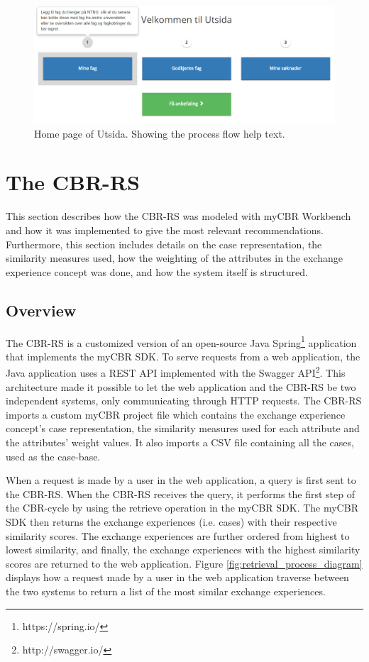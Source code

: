 \begin{figure}[h]
    \centering
    \includegraphics[width=1\textwidth]{fig/utsida_screenshots/steps.png}
    \caption[Home page of Utsida]{Home page of Utsida. Showing the process flow help text.}
    \label{fig:utsida_index}
\end{figure}

\section{The CBR-RS}

This section describes how the CBR-RS was modeled with myCBR Workbench and how it was implemented to give the most relevant recommendations. Furthermore, this section includes details on the case representation, the similarity measures used, how the weighting of the attributes in the exchange experience concept was done, and how the system itself is structured.

\subsection{Overview}

The CBR-RS is a customized version of an open-source Java Spring\footnote{https://spring.io/} application that implements the myCBR SDK. To serve requests from a web application, the Java application uses a REST API implemented with the Swagger API\footnote{http://swagger.io/}. This architecture made it possible to let the web application and the CBR-RS be two independent systems, only communicating through HTTP requests. The CBR-RS imports a custom myCBR project file which contains the exchange experience concept's case representation, the similarity measures used for each attribute and the attributes' weight values. It also imports a CSV file containing all the cases, used as the case-base.

When a request is made by a user in the web application, a query is first sent to the CBR-RS. When the CBR-RS receives the query, it performs the first step of the CBR-cycle by using the retrieve operation in the myCBR SDK. The myCBR SDK then returns the exchange experiences (i.e. cases) with their respective similarity scores. The exchange experiences are further ordered from highest to lowest similarity, and finally, the exchange experiences with the highest similarity scores are returned to the web application. Figure \ref{fig:retrieval_process_diagram} displays how a request made by a user in the web application traverse between the two systems to return a list of the most similar exchange experiences.

